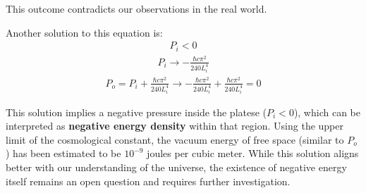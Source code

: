 This outcome contradicts our observations in the real world.

Another solution to this equation is:
\begin{align}P_i < 0\end{align}
\begin{align}P_i \rightarrow -\frac{\hbar c \pi^2}{240 L_i^4}\end{align}
\begin{align}P_o = P_i + \frac{\hbar c \pi^2}{240 L_i^4} \rightarrow -\frac{\hbar c \pi^2}{240 L_i^4} + \frac{\hbar c \pi^2}{240 L_i^4} = 0\end{align}

This solution implies a negative pressure inside the platese ($P_i < 0$), which can be interpreted as \textbf{negative energy density} within that region.
Using the upper limit of the cosmological constant, the vacuum energy of free space (similar to $P_o$) has been estimated to be $10^{-9}$ joules per cubic meter.
While this solution aligns better with our understanding of the universe, 
the existence of negative energy itself remains an open question and requires further investigation.
